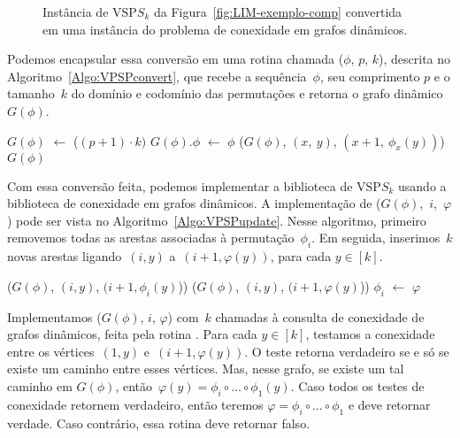 \begin{figure}[htb]
\centering

\caption{Instância de VSP$S_k$ da Figura~\ref{fig:LIM-exemplo-comp} convertida em uma instância do problema de conexidade em grafos dinâmicos.}
\label{fig:LIM-convertido}
\end{figure}

Podemos encapsular essa conversão em uma rotina chamada \VPSPconvert($\phi$, $p$, $k$), descrita no Algoritmo~\ref{Algo:VPSPconvert}, que recebe a sequência~$\phi$, seu comprimento $p$ e o tamanho~$k$ do domínio e codomínio das permutações e retorna o grafo dinâmico~$G(\phi)$.

\begin{algorithm}[htb]
\caption{\VPSPconvert($\phi$, $p$, $k$)}
\label{Algo:VPSPconvert}
\begin{algorithmic}[1]
\State $G(\phi)$ $\gets$ \dymGraphCreate($(p+1)\cdot k)$
\State $G(\phi).\phi$ $\gets$ $\phi$
    \State \dymGraphAddEdge($G(\phi)$, $(x,~y)$, $(x+1, ~\phi_x(y))$)
  \EndFor
\EndFor
\State \Return $G(\phi)$
\end{algorithmic}
\end{algorithm}


Com essa conversão feita, podemos implementar a biblioteca de VSP$S_k$ usando a biblioteca de conexidade em grafos dinâmicos. A implementação de \mbox{\VPSPupdate($G(\phi)$, $i$,~$\varphi$)} pode ser vista no Algoritmo~\ref{Algo:VPSPupdate}. Nesse algoritmo, primeiro removemos todas as arestas associadas à permutação~$\phi_i$. Em seguida, inserimos~$k$ novas arestas ligando~$(i,y)$ a~${(i+1,\varphi(y))}$, para cada $y\in[k]$.


\begin{algorithm}[htb]
\caption{\VPSPupdate($G(\phi)$, $i$, $\varphi$)}
\label{Algo:VPSPupdate}
\begin{algorithmic}[1]
  \State \dymGraphDelEdge($G(\phi)$, $(i,y)$, $(i+1,\phi_i(y)$))
\EndFor
{}
  \State \dymGraphAddEdge($G(\phi)$, $(i,y)$, $(i+1,\varphi(y)$))
\EndFor
\State $\phi_i$ $\gets$ $\varphi$ 
\end{algorithmic}
\end{algorithm}


Implementamos \VPSPverify($G(\phi)$, $i$, $\varphi$) com~$k$ chamadas à consulta de conexidade de grafos dinâmicos, feita pela rotina \dymGraphQuery{}. Para cada $y\in[k]$, testamos a conexidade entre os vértices~$(1,y)$ e~$(i+1,\varphi(y))$. O teste retorna verdadeiro se e só se existe um caminho entre esses vértices. Mas, nesse grafo, se existe um tal caminho em $G(\phi)$, então~$\varphi(y) = \phi_i\circ\dots\circ\phi_1(y)$. Caso todos os testes de conexidade retornem verdadeiro, então teremos $\varphi = \phi_i\circ\dots\circ\phi_1$ e \VPSPverify{} deve retornar verdade. Caso contrário, essa rotina deve retornar falso. 

